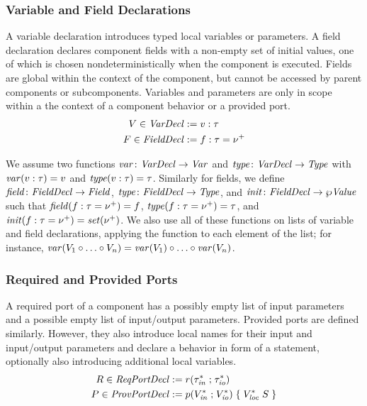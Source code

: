 \documentclass[a4paper,10pt,english]{article}
\begin{document}
\subsubsection{Variable and Field Declarations}
A variable declaration introduces typed local variables or parameters.
A field declaration declares component fields with a non-empty set of initial values, one of which is chosen
nondeterministically when the component is executed. Fields are global within the context of the component, but cannot be accessed
by parent components or subcomponents. Variables and parameters are only in scope within a the context of a component behavior or
a provided port.
\begin{align*}
	V \in \mathit{VarDecl} &:= v \; \mathtt{:} \; \tau \\
	F \in \mathit{FieldDecl} &:= f \; \mathtt{:} \; \tau \; \mathtt{=} \; \nu^+
\end{align*}

We assume two functions $\mathit{var} \colon \mathit{VarDecl} \rightarrow \mathit{Var}$ and $\mathit{type} \colon \mathit{VarDecl} \rightarrow \mathit{Type}$ with
$\mathit{var}(v \; \mathtt{:} \; \tau) = v$ and $\mathit{type}(v \; \mathtt{:} \; \tau) = \tau$. Similarly for fields, we define
$\mathit{field} \colon \mathit{FieldDecl} \rightarrow \mathit{Field}$, $\mathit{type} \colon \mathit{FieldDecl} \rightarrow \mathit{Type}$, and $\mathit{init} \colon \mathit{FieldDecl} \rightarrow
\wp \mathit{Value}$ such that $\mathit{field}(f \; \mathtt{:} \; \tau \; \mathtt{=} \; \nu^+) = f$,
$\mathit{type}(f \; \mathtt{:} \; \tau \; \mathtt{=} \; \nu^+) = \tau$, and
$\mathit{init}(f \; \mathtt{:} \; \tau \; \mathtt{=} \; \nu^+) = \mathit{set}(\nu^+)$. We also use all of these functions
on lists of variable and field declarations, applying the function to each element of the list; for instance, $\mathit{var}(V_1
\circ \ldots \circ V_n) = \mathit{var}(V_1) \circ \ldots \circ \mathit{var}(V_n)$.

\subsubsection{Required and Provided Ports}
A required port of a component has a possibly empty list of input parameters and a possible empty list of input/output parameters. 
Provided ports are defined similarly. However, they also introduce local names for their input and input/output parameters and
declare a behavior in form of a statement, optionally also introducing additional local variables. 
\begin{align*}
	R \in \mathit{ReqPortDecl} &:=
		r \mathtt{(} \tau_\mathit{in}^* \; \mathtt{;} \; \tau_\mathit{io}^* \mathtt{)}
	\\
	P \in \mathit{ProvPortDecl} &:= p \mathtt{(} V^*_\mathit{in} \; \mathtt{;} \; V^*_\mathit{io} \mathtt{) \; \{} \; V^*_\mathit{loc} \; S \; \mathtt{\}}
\end{align*}
\end{document}
